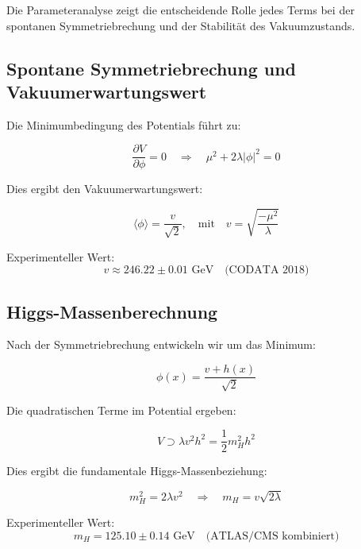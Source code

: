 \documentclass[12pt,a4paper]{article}
\theoremstyle{definition}
\begin{document}
	Die Parameteranalyse zeigt die entscheidende Rolle jedes Terms bei der spontanen Symmetriebrechung und der Stabilität des Vakuumzustands.
	
	\subsection{Spontane Symmetriebrechung und Vakuumerwartungswert}
	
	Die Minimumbedingung des Potentials führt zu:
	
	\begin{equation}
		\frac{\partial V}{\partial \phi} = 0 \quad \Rightarrow \quad \mu^2 + 2\lambda|\phi|^2 = 0
	\end{equation}
	
	Dies ergibt den Vakuumerwartungswert:
	
	\begin{formel}
		\begin{equation}
			\langle\phi\rangle = \frac{v}{\sqrt{2}}, \quad \text{mit} \quad v = \sqrt{\frac{-\mu^2}{\lambda}}
		\end{equation}
		
		Experimenteller Wert:
		\begin{equation}
			v \approx 246.22 \pm 0.01 \text{ GeV} \quad \text{(CODATA 2018)}
		\end{equation}
	\end{formel}
	
	\subsection{Higgs-Massenberechnung}
	
	Nach der Symmetriebrechung entwickeln wir um das Minimum:
	
	\begin{equation}
		\phi(x) = \frac{v + h(x)}{\sqrt{2}}
	\end{equation}
	
	Die quadratischen Terme im Potential ergeben:
	
	\begin{equation}
		V \supset \lambda v^2 h^2 = \frac{1}{2}m_H^2 h^2
	\end{equation}
	
	Dies ergibt die fundamentale Higgs-Massenbeziehung:
	
	\begin{formel}
		\begin{equation}
			m_H^2 = 2\lambda v^2 \quad \Rightarrow \quad m_H = v\sqrt{2\lambda}
		\end{equation}
		
		Experimenteller Wert:
		\begin{equation}
			m_H = 125.10 \pm 0.14 \text{ GeV} \quad \text{(ATLAS/CMS kombiniert)}
		\end{equation}
	\end{formel}
	
\end{document}

